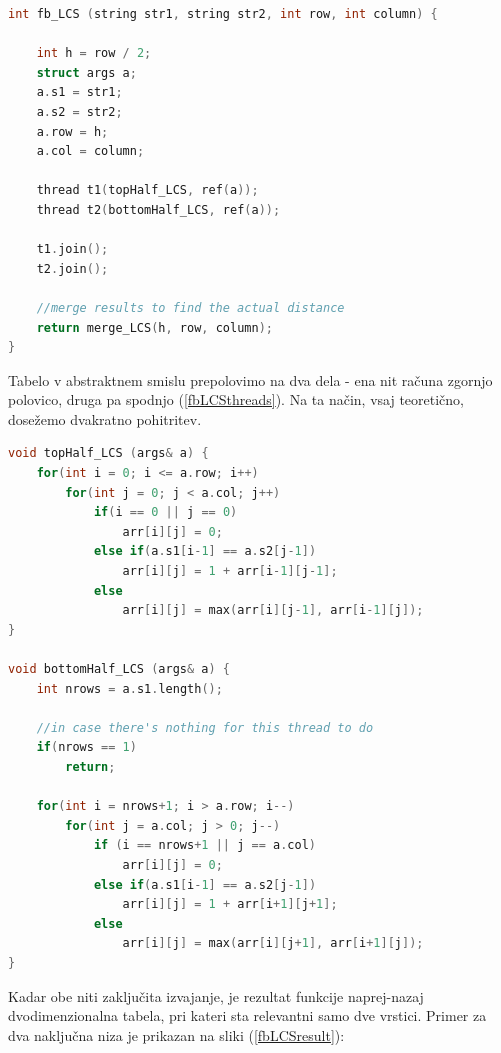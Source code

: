\documentclass[a4paper,12pt,openright]{book}
\begin{document}
\bigskip
\begin{lstlisting}[language=C++, caption={Algoritem LCS naprej-nazaj}, captionpos=b, label=fbLCS]
int fb_LCS (string str1, string str2, int row, int column) {

    int h = row / 2;
    struct args a; 
    a.s1 = str1;
    a.s2 = str2;
    a.row = h;
    a.col = column;

    thread t1(topHalf_LCS, ref(a));
    thread t2(bottomHalf_LCS, ref(a));
    
    t1.join();
    t2.join();

    //merge results to find the actual distance
    return merge_LCS(h, row, column);
}
\end{lstlisting}

Tabelo v abstraktnem smislu prepolovimo na dva dela - ena nit računa zgornjo polovico, druga pa spodnjo (\ref{fbLCSthreads}). Na ta način, vsaj teoretično, dosežemo dvakratno pohitritev. 

\bigskip
\begin{lstlisting}[language=C++, caption={Vsaka nit računa svojo polovico tabele}, captionpos=b, label=fbLCSthreads]
void topHalf_LCS (args& a) {
    for(int i = 0; i <= a.row; i++) 
        for(int j = 0; j < a.col; j++)
            if(i == 0 || j == 0)
                arr[i][j] = 0;        
            else if(a.s1[i-1] == a.s2[j-1])
                arr[i][j] = 1 + arr[i-1][j-1];
            else 
                arr[i][j] = max(arr[i][j-1], arr[i-1][j]);
}

void bottomHalf_LCS (args& a) {
    int nrows = a.s1.length();

    //in case there's nothing for this thread to do
    if(nrows == 1)
        return;

    for(int i = nrows+1; i > a.row; i--) 
        for(int j = a.col; j > 0; j--) 
            if (i == nrows+1 || j == a.col) 
                arr[i][j] = 0;
            else if(a.s1[i-1] == a.s2[j-1])
                arr[i][j] = 1 + arr[i+1][j+1];
            else
                arr[i][j] = max(arr[i][j+1], arr[i+1][j]);
}
\end{lstlisting}

Kadar obe niti zaključita izvajanje, je rezultat funkcije naprej-nazaj dvodimenzionalna tabela, pri kateri sta relevantni samo dve vrstici. Primer za dva naključna niza je prikazan na sliki (\ref{fbLCSresult}):
\end{document}
